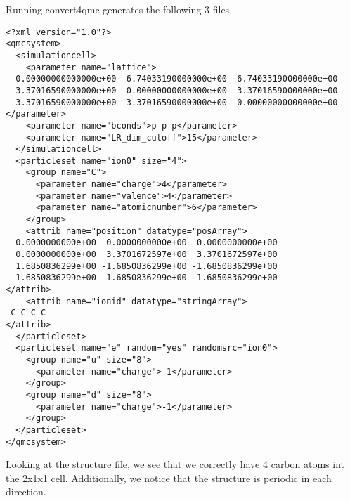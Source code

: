 Running convert4qmc generates the following 3 files
\begin{lstlisting}[caption=diamond.structure.xml. This file contains the geometry of the system]
<?xml version="1.0"?>
<qmcsystem>
  <simulationcell>
    <parameter name="lattice">
  0.00000000000000e+00  6.74033190000000e+00  6.74033190000000e+00
  3.37016590000000e+00  0.00000000000000e+00  3.37016590000000e+00
  3.37016590000000e+00  3.37016590000000e+00  0.00000000000000e+00
</parameter>
    <parameter name="bconds">p p p</parameter>
    <parameter name="LR_dim_cutoff">15</parameter>
  </simulationcell>
  <particleset name="ion0" size="4">
    <group name="C">
      <parameter name="charge">4</parameter>
      <parameter name="valence">4</parameter>
      <parameter name="atomicnumber">6</parameter>
    </group>
    <attrib name="position" datatype="posArray">
  0.0000000000e+00  0.0000000000e+00  0.0000000000e+00
  0.0000000000e+00  3.3701672597e+00  3.3701672597e+00
  1.6850836299e+00 -1.6850836299e+00 -1.6850836299e+00
  1.6850836299e+00  1.6850836299e+00  1.6850836299e+00
</attrib>
    <attrib name="ionid" datatype="stringArray">
 C C C C
</attrib>
  </particleset>
  <particleset name="e" random="yes" randomsrc="ion0">
    <group name="u" size="8">
      <parameter name="charge">-1</parameter>
    </group>
    <group name="d" size="8">
      <parameter name="charge">-1</parameter>
    </group>
  </particleset>
</qmcsystem>
\end{lstlisting}
Looking at the structure file, we see that we correctly have 4 carbon atoms int the 2x1x1 cell.
Additionally, we notice that the structure is periodic in each direction.
